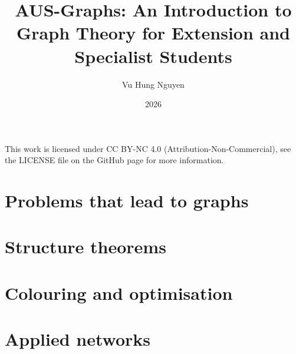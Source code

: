 \documentclass[11pt]{book}
\title{AUS-Graphs: An Introduction to Graph Theory for Extension and Specialist Students}
\author{Vu Hung Nguyen}
\date{2026}
\begin{document}


\setcounter{page}{1}

\thispagestyle{empty}

\begingroup\small\noindent
This work is licensed under CC BY-NC 4.0 (Attribution-Non-Commercial), see the LICENSE file on the GitHub page for more information.
\par\endgroup

\clearpage


\clearpage


\clearpage
\tableofcontents
\clearpage



\mainmatter
\part{Problems that lead to graphs}




\part{Structure theorems}



\part{Colouring and optimisation}




\appendix
\part{Applied networks}





\backmatter





\end{document}
